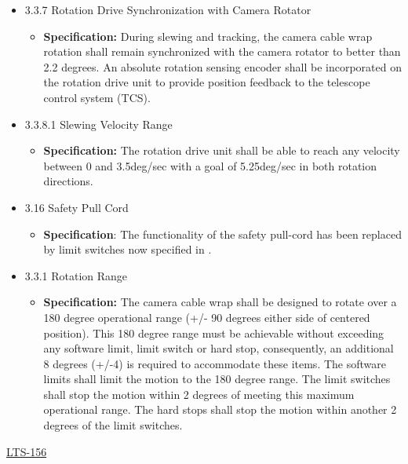 \documentclass[SE,lsstdraft,authoryear,toc]{lsstdoc}
\begin{document}
\begin{itemize}
\item
  3.3.7 Rotation Drive Synchronization with Camera Rotator

  \begin{itemize}
  \item
    \textbf{Specification:} During slewing and tracking, the camera
    cable wrap rotation shall remain synchronized with the camera
    rotator to better than 2.2 degrees. An absolute rotation sensing
    encoder shall be incorporated on the rotation drive unit to provide
    position feedback to the telescope control system (TCS).
  \end{itemize}
\item
  3.3.8.1 Slewing Velocity Range

  \begin{itemize}
  \item
    \textbf{Specification:} The rotation drive unit shall be able to
    reach any velocity between 0 and 3.5deg/sec with a goal of
    5.25deg/sec in both rotation directions.
  \end{itemize}
\item
  3.16 Safety Pull Cord

  \begin{itemize}
  \item
    \textbf{Specification}: The functionality of the safety pull-cord
    has been replaced by limit switches now specified in .
  \end{itemize}
\item
  3.3.1 Rotation Range

  \begin{itemize}
  \item
    \textbf{Specification:} The camera cable wrap shall be designed to rotate
    over a 180 degree operational range (+/- 90 degrees either side of
    centered position). This 180 degree range must be achievable without
    exceeding any software limit, limit switch or hard stop,
    consequently, an additional 8 degrees (+/-4) is required to
    accommodate these items. The software limits shall limit the motion
    to the 180 degree range. The limit switches shall stop the motion
    within 2 degrees of meeting this maximum operational range. The hard
    stops shall stop the motion within another 2 degrees of the limit
    switches.
  \end{itemize}
\end{itemize}

\underline{LTS-156}
\end{document}
